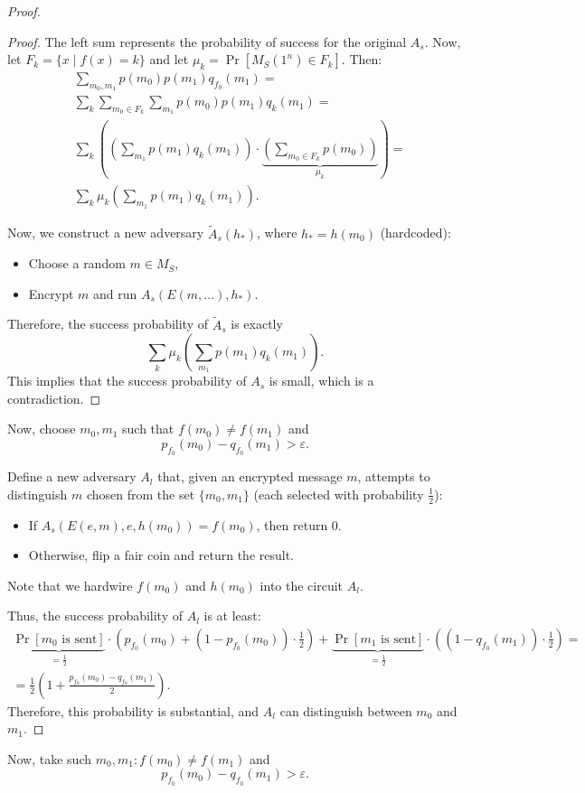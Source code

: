\begin{proof}
\begin{proof}
		The left sum represents the probability of success for the original $A_s$.
		Now, let $F_k = \{x \mid f(x) = k\}$ and let $\mu_k = \Pr[M_S(1^{n}) \in F_k]$.
		Then:
		\begin{align*}
			&\sum_{m_0, m_1} p(m_0) p(m_1) q_{f_0}(m_1) = \\
			& \sum_{k} \sum_{m_0 \in F_k} \sum_{m_1} p(m_0) p(m_1) q_k(m_1) = \\   
			& \sum_{k} \left(\left(\sum_{m_1} p(m_1) q_k(m_1) \right) \cdot \underbrace{\left(\sum_{m_0 \in F_k} p(m_0)\right)}_{\mu_k} \right) = \\
			& \sum_{k} \mu_k \left( \sum_{m_1} p(m_1) q_k(m_1) \right).
		\end{align*}

		Now, we construct a new adversary $\tilde{A}_s(h_*)$, where $h_* = h(m_0)$ (hardcoded):
		\begin{itemize}
			\item Choose a random $m \in M_S$,
			\item Encrypt $m$ and run $A_s(E(m, \ldots), h_*)$.
		\end{itemize}
		Therefore, the success probability of $\tilde{A}_s$ is exactly
		\[
		\sum_{k} \mu_k \left( \sum_{m_1} p(m_1) q_k(m_1) \right).
		\] 
		This implies that the success probability of $A_s$ is small, which is a contradiction.
	\end{proof}

	Now, choose $m_0, m_1$ such that $f(m_0) \neq f(m_1)$ and
	\[
		p_{f_0}(m_0) - q_{f_0}(m_1) > \varepsilon.
	\] 

	Define a new adversary $A_l$ that, given an encrypted message $m$, attempts to distinguish $m$ chosen from the set $\{m_0, m_1\}$ (each selected with probability $\frac{1}{2}$):
	\begin{itemize}
		\item If $A_s(E(e, m), e, h(m_0)) = f(m_0)$, then return 0.
		\item Otherwise, flip a fair coin and return the result.
	\end{itemize}
	Note that we hardwire $f(m_0)$ and $h(m_0)$ into the circuit $A_l$.

	Thus, the success probability of $A_l$ is at least:
	\begin{align*}
		\underbrace{\Pr[m_0 \text{ is sent}]}_{=\frac{1}{2}} \cdot \left(p_{f_0}(m_0) + (1 - p_{f_0}(m_0)) \cdot \frac{1}{2}\right) + \underbrace{\Pr[m_1 \text{ is sent}]}_{=\frac{1}{2}} \cdot \left((1 - q_{f_0}(m_1)) \cdot \frac{1}{2}\right) = \\
		= \frac{1}{2} \left(1 + \frac{p_{f_0}(m_0) - q_{f_0}(m_1)}{2}\right).
	\end{align*}
	Therefore, this probability is substantial, and $A_l$ can distinguish between $m_0$ and $m_1$.
	\end{proof}
	Now, take such $m_0, m_1  \colon f(m_0) \neq  f(m_1)$ and
	\[
		p_{f_0}(m_0) - q_{f_0}(m_1) > \varepsilon
	.\] 

